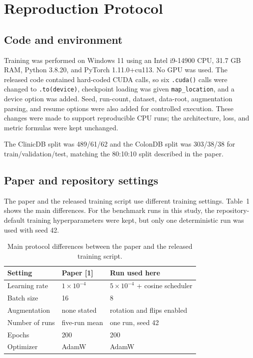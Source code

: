 \documentclass[10pt,a4paper]{article}
\begin{document}
\section{Reproduction Protocol}

\subsection{Code and environment}

Training was performed on Windows 11 using an Intel i9-14900 CPU, 31.7 GB RAM, Python 3.8.20, and PyTorch 1.11.0+cu113. No GPU was used. The released code contained hard-coded CUDA calls, so six \texttt{.cuda()} calls were changed to \texttt{.to(device)}, checkpoint loading was given \texttt{map\_location}, and a device option was added. Seed, run-count, dataset, data-root, augmentation parsing, and resume options were also added for controlled execution. These changes were made to support reproducible CPU runs; the architecture, loss, and metric formulas were kept unchanged.

The ClinicDB split was 489/61/62 and the ColonDB split was 303/38/38 for train/validation/test, matching the 80:10:10 split described in the paper.

\subsection{Paper and repository settings}

The paper and the released training script use different training settings. Table~1 shows the main differences. For the benchmark runs in this study, the repository-default training hyperparameters were kept, but only one deterministic run was used with seed 42.

\begin{table}[h]
\centering\small
\caption{Main protocol differences between the paper and the released training script.}
\begin{tabular}{@{}lll@{}}
\toprule
Setting & Paper [1] & Run used here \\
\midrule
Learning rate & $1\times10^{-4}$ & $5\times10^{-4}$ + cosine scheduler \\
Batch size & 16 & 8 \\
Augmentation & none stated & rotation and flips enabled \\
Number of runs & five-run mean & one run, seed 42 \\
Epochs & 200 & 200 \\
Optimizer & AdamW & AdamW \\
\bottomrule
\end{tabular}
\end{table}
\end{document}
